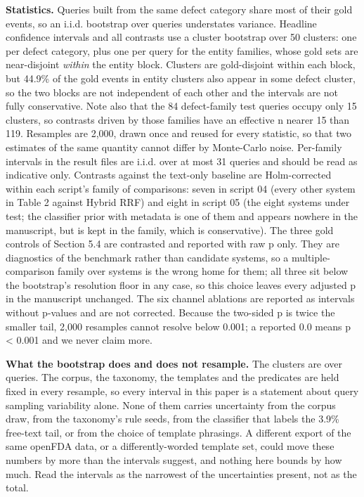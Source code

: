 \documentclass[acmsmall]{acmart}
\begin{document}
\textbf{Statistics.} Queries built from the same defect category share most of their gold events, so an i.i.d. bootstrap over queries understates variance. Headline confidence intervals and all contrasts use a cluster bootstrap over 50 clusters: one per defect category, plus one per query for the entity families, whose gold sets are near-disjoint \textit{within} the entity block. Clusters are gold-disjoint within each block, but 44.9\% of the gold events in entity clusters also appear in some defect cluster, so the two blocks are not independent of each other and the intervals are not fully conservative. Note also that the 84 defect-family test queries occupy only 15 clusters, so contrasts driven by those families have an effective n nearer 15 than 119. Resamples are 2,000, drawn once and reused for every statistic, so that two estimates of the same quantity cannot differ by Monte-Carlo noise. Per-family intervals in the result files are i.i.d. over at most 31 queries and should be read as indicative only. Contrasts against the text-only baseline are Holm-corrected within each script's family of comparisons: seven in script 04 (every other system in Table 2 against Hybrid RRF) and eight in script 05 (the eight systems under test; the classifier prior with metadata is one of them and appears nowhere in the manuscript, but is kept in the family, which is conservative). The three gold controls of Section 5.4 are contrasted and reported with raw p only. They are diagnostics of the benchmark rather than candidate systems, so a multiple-comparison family over systems is the wrong home for them; all three sit below the bootstrap's resolution floor in any case, so this choice leaves every adjusted p in the manuscript unchanged. The six channel ablations are reported as intervals without p-values and are not corrected. Because the two-sided p is twice the smaller tail, 2,000 resamples cannot resolve below 0.001; a reported 0.0 means p < 0.001 and we never claim more.

\textbf{What the bootstrap does and does not resample.} The clusters are over queries. The corpus, the taxonomy, the templates and the predicates are held fixed in every resample, so every interval in this paper is a statement about query sampling variability alone. None of them carries uncertainty from the corpus draw, from the taxonomy's rule seeds, from the classifier that labels the 3.9\% free-text tail, or from the choice of template phrasings. A different export of the same openFDA data, or a differently-worded template set, could move these numbers by more than the intervals suggest, and nothing here bounds by how much. Read the intervals as the narrowest of the uncertainties present, not as the total.
\end{document}
